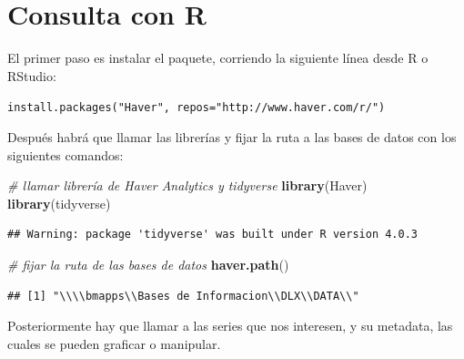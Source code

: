 \documentclass[
]{book}
\newenvironment{Shaded}{\begin{snugshade}}{\end{snugshade}}
\newcommand{\CommentTok}[1]{\textcolor[rgb]{0.56,0.35,0.01}{\textit{#1}}}
\newcommand{\KeywordTok}[1]{\textcolor[rgb]{0.13,0.29,0.53}{\textbf{#1}}}
\newcommand{\NormalTok}[1]{#1}
\begin{document}
\hypertarget{consulta-con-r}{%
\section{Consulta con R}\label{consulta-con-r}}

El primer paso es instalar el paquete, corriendo la siguiente línea desde R o RStudio:

\texttt{install.packages("Haver",\ repos="http://www.haver.com/r/")}

Después habrá que llamar las librerías y fijar la ruta a las bases de datos con los siguientes comandos:

\begin{Shaded}
\begin{Highlighting}[]
\CommentTok{# llamar librería de Haver Analytics y tidyverse}
\KeywordTok{library}\NormalTok{(Haver)}
\KeywordTok{library}\NormalTok{(tidyverse)}
\end{Highlighting}
\end{Shaded}

\begin{verbatim}
## Warning: package 'tidyverse' was built under R version 4.0.3
\end{verbatim}

\begin{Shaded}
\begin{Highlighting}[]
\CommentTok{# fijar la ruta de las bases de datos}
\KeywordTok{haver.path}\NormalTok{()}
\end{Highlighting}
\end{Shaded}

\begin{verbatim}
## [1] "\\\\bmapps\\Bases de Informacion\\DLX\\DATA\\"
\end{verbatim}

Posteriormente hay que llamar a las series que nos interesen, y su metadata, las cuales se pueden graficar o manipular.
\end{document}
